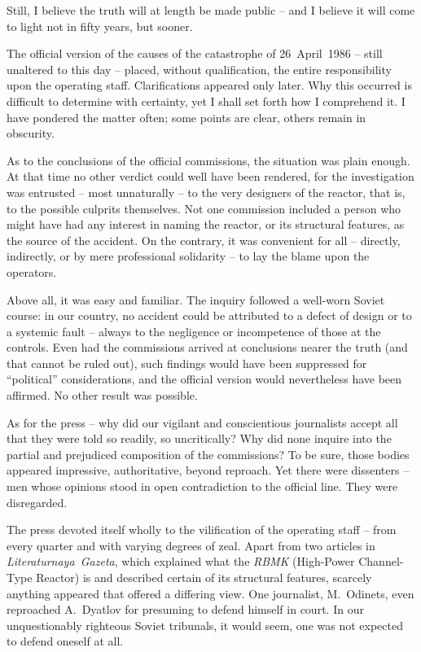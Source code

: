 \documentclass[openright]{bookest}
\begin{document}
Still, I believe the truth will at length be made public -- and I believe it will come to light not in fifty years, but sooner.


The official version of the causes of the catastrophe of 26~April~1986 -- still unaltered to this day -- placed, without qualification, the entire responsibility upon the operating staff. Clarifications appeared only later. Why this occurred is difficult to determine with certainty, yet I shall set forth how I comprehend it. I have pondered the matter often; some points are clear, others remain in obscurity.

As to the conclusions of the official commissions, the situation was plain enough. At that time no other verdict could well have been rendered, for the investigation was entrusted -- most unnaturally -- to the very designers of the reactor, that is, to the possible culprits themselves. Not one commission included a person who might have had any interest in naming the reactor, or its structural features, as the source of the accident. On the contrary, it was convenient for all -- directly, indirectly, or by mere professional solidarity -- to lay the blame upon the operators.

Above all, it was easy and familiar. The inquiry followed a well-worn Soviet course: in our country, no accident could be attributed to a defect of design or to a systemic fault -- always to the negligence or incompetence of those at the controls. Even had the commissions arrived at conclusions nearer the truth (and that cannot be ruled out), such findings would have been suppressed for ``political'' considerations, and the official version would nevertheless have been affirmed. No other result was possible.

As for the press -- why did our vigilant and conscientious journalists accept all that they were told so readily, so uncritically? Why did none inquire into the partial and prejudiced composition of the commissions? To be sure, those bodies appeared impressive, authoritative, beyond reproach. Yet there were dissenters -- men whose opinions stood in open contradiction to the official line. They were disregarded.


The press devoted itself wholly to the vilification of the operating staff -- from every quarter and with varying degrees of zeal. Apart from two articles in \textit{Literaturnaya~Gazeta}, which explained what the \textit{RBMK} (High-Power Channel-Type Reactor) is and described certain of its structural features, scarcely anything appeared that offered a differing view. One journalist, M.~Odinets, even reproached A.~Dyatlov for presuming to defend himself in court. In our unquestionably righteous Soviet tribunals, it would seem, one was not expected to defend oneself at all.
\end{document}
